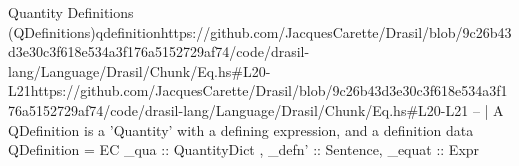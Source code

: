 \begin{haskell}{Quantity Definitions (QDefinitions)}{qdefinition}{https://github.com/JacquesCarette/Drasil/blob/9c26b43d3e30c3f618e534a3f176a5152729a\newline{}f74/code/drasil-lang/Language/Drasil/Chunk/Eq.hs\#L20-L21}{https://github.com/JacquesCarette/Drasil/blob/9c26b43d3e30c3f618e534a3f176a5152729af74/code/drasil-lang/Language/Drasil/Chunk/Eq.hs\#L20-L21}
-- | A QDefinition is a 'Quantity' with a defining expression, and a definition
data QDefinition = EC { _qua :: QuantityDict , _defn' :: Sentence, _equat :: Expr }
\end{haskell}
